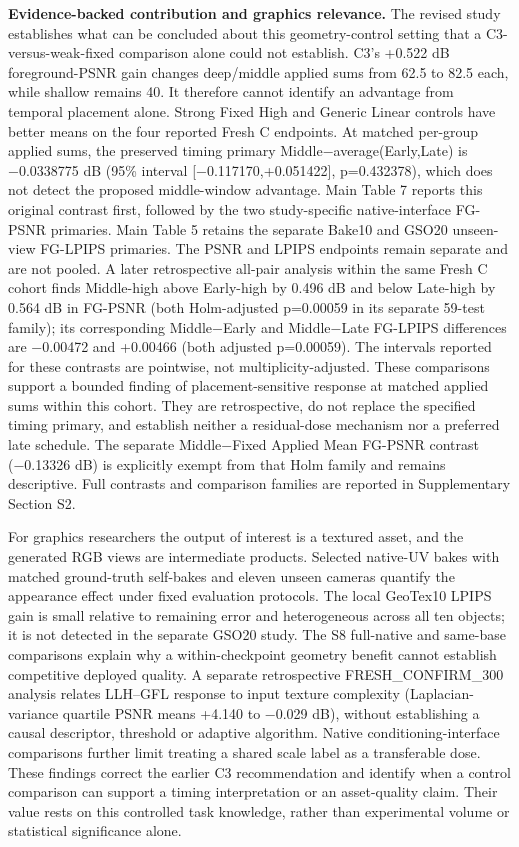 \documentclass[
  10pt,
]{article}
\begin{document}
\textbf{Evidence-backed contribution and graphics relevance.} The
revised study establishes what can be concluded about this
geometry-control setting that a C3-versus-weak-fixed comparison alone
could not establish. C3's +0.522 dB foreground-PSNR gain changes
deep/middle applied sums from 62.5 to 82.5 each, while shallow remains
40. It therefore cannot identify an advantage from temporal placement
alone. Strong Fixed High and Generic Linear controls have better means
on the four reported Fresh C endpoints. At matched per-group applied
sums, the preserved timing primary Middle−average(Early,Late) is
−0.0338775 dB (95\% interval {[}−0.117170,+0.051422{]}, p=0.432378),
which does not detect the proposed middle-window advantage. Main Table 7
reports this original contrast first, followed by the two study-specific
native-interface FG-PSNR primaries. Main Table 5 retains the separate
Bake10 and GSO20 unseen-view FG-LPIPS primaries. The PSNR and LPIPS
endpoints remain separate and are not pooled. A later retrospective
all-pair analysis within the same Fresh C cohort finds Middle-high above
Early-high by 0.496 dB and below Late-high by 0.564 dB in FG-PSNR (both
Holm-adjusted p=0.00059 in its separate 59-test family); its
corresponding Middle−Early and Middle−Late FG-LPIPS differences are
−0.00472 and +0.00466 (both adjusted p=0.00059). The intervals reported
for these contrasts are pointwise, not multiplicity-adjusted. These
comparisons support a bounded finding of placement-sensitive response at
matched applied sums within this cohort. They are retrospective, do not
replace the specified timing primary, and establish neither a
residual-dose mechanism nor a preferred late schedule. The separate
Middle−Fixed Applied Mean FG-PSNR contrast (−0.13326 dB) is explicitly
exempt from that Holm family and remains descriptive. Full contrasts and
comparison families are reported in Supplementary Section S2.

For graphics researchers the output of interest is a textured asset, and
the generated RGB views are intermediate products. Selected native-UV
bakes with matched ground-truth self-bakes and eleven unseen cameras
quantify the appearance effect under fixed evaluation protocols. The
local GeoTex10 LPIPS gain is small relative to remaining error and
heterogeneous across all ten objects; it is not detected in the separate
GSO20 study. The S8 full-native and same-base comparisons explain why a
within-checkpoint geometry benefit cannot establish competitive deployed
quality. A separate retrospective FRESH\_CONFIRM\_300 analysis relates
LLH--GFL response to input texture complexity (Laplacian-variance
quartile PSNR means +4.140 to −0.029 dB), without establishing a causal
descriptor, threshold or adaptive algorithm. Native
conditioning-interface comparisons further limit treating a shared scale
label as a transferable dose. These findings correct the earlier C3
recommendation and identify when a control comparison can support a
timing interpretation or an asset-quality claim. Their value rests on
this controlled task knowledge, rather than experimental volume or
statistical significance alone.
\end{document}

